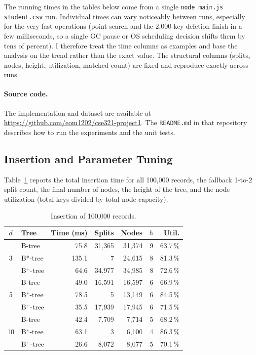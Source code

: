 \documentclass[sigconf]{acmart}
\begin{document}
The running times in the tables below come from a single
\texttt{node main.js student.csv} run. Individual times can vary
noticeably between runs, especially for the very fast operations
(point search and the 2{,}000-key deletion finish in a few
milliseconds, so a single GC pause or OS scheduling decision shifts
them by tens of percent). I therefore treat the time columns as
examples and base the analysis on the trend rather than the
exact value. The structural columns (splits, nodes, height,
utilization, matched count) are fixed and reproduce exactly
across runs.

\paragraph{Source code.}
The implementation and dataset are available at
\url{https://github.com/eom1202/cse321-project1}.
The \texttt{README.md} in that repository describes how to run the
experiments and the unit tests.

\subsection{Insertion and Parameter Tuning}

Table~\ref{tab:insert} reports the total insertion time for all
100{,}000 records, the fallback 1-to-2 split count, the final number
of nodes, the height of the tree, and the node utilization (total keys
divided by total node capacity).

\begin{table}[h]
\centering
\small
\caption{Insertion of 100{,}000 records.}
\label{tab:insert}
\begin{tabular}{cl rrrrr}
\toprule
$d$ & Tree & Time (ms) & Splits & Nodes & $h$ & Util.\\
\midrule
\multirow{3}{*}{3}
 & B-tree   &  75.8 & 31{,}365 & 31{,}374 & 9 & 63.7\,\% \\
 & B*-tree  & 135.1 &      7 & 24{,}615 & 8 & 81.3\,\% \\
 & B$^+$-tree &  64.6 & 34{,}977 & 34{,}985 & 8 & 72.6\,\% \\
\midrule
\multirow{3}{*}{5}
 & B-tree   &  49.0 & 16{,}591 & 16{,}597 & 6 & 66.9\,\% \\
 & B*-tree  &  78.5 &      5 & 13{,}149 & 6 & 84.5\,\% \\
 & B$^+$-tree &  35.5 & 17{,}939 & 17{,}945 & 6 & 71.5\,\% \\
\midrule
\multirow{3}{*}{10}
 & B-tree   &  42.4 &  7{,}709 &  7{,}714 & 5 & 68.2\,\% \\
 & B*-tree  &  63.1 &      3 &  6{,}100 & 4 & 86.3\,\% \\
 & B$^+$-tree &  26.6 &  8{,}072 &  8{,}077 & 5 & 70.1\,\% \\
\bottomrule
\end{tabular}
\end{table}
\end{document}
